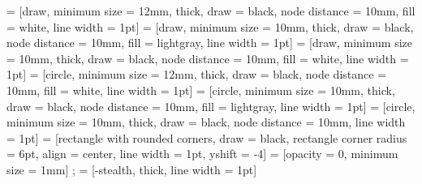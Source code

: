 \documentclass[12pt]{article}
\begin{document}
\setlength{\parindent}{-4cm}


 = [draw,  minimum size = 12mm, thick, draw = black, node distance = 10mm, fill  = white, line width = 1pt]
 = [draw,  minimum size = 10mm, thick, draw = black, node distance = 10mm, fill  = lightgray, line width = 1pt]
 = [draw,  minimum size = 10mm, thick, draw = black, node distance = 10mm, fill  = white, line width = 1pt]
 = [circle,  minimum size = 12mm, thick, draw = black, node distance = 10mm, fill  = white, line width = 1pt]
 = [circle, minimum size = 10mm, thick, draw = black, node distance = 10mm, fill = lightgray, line width = 1pt]
 = [circle, minimum size = 10mm, thick, draw = black, node distance = 10mm, line width = 1pt]
 = [rectangle with rounded corners, draw = black, rectangle corner radius = 6pt, align = center, line width = 1pt, yshift = -4]
 = [opacity = 0, minimum size = 1mm] {};
 = [-stealth, thick, line width = 1pt]

\end{document}
